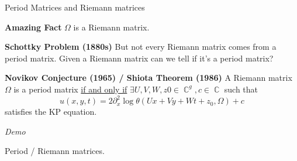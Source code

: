 \documentclass{beamer}
\DeclareMathOperator{\CC}{\mathbb{C}}
\begin{document}
\begin{frame}{Period Matrices and Riemann matrices}{}
  \begin{block}{\bf Amazing Fact}
    $\Omega$ is a Riemann matrix.
  \end{block}

  \vspace{16pt}

     {
      \begin{block}{\bf Schottky Problem (1880s)}
        But not every Riemann matrix comes from a period matrix. Given a
        Riemann matrix can we tell if it's a period matrix?
      \end{block}
    }

     {
      \begin{block}{\bf Novikov Conjecture (1965) / Shiota Theorem (1986)}
        A Riemann matrix $\Omega$ is a period matrix \underline{if and
          only if} $\exists U,V,W,z0 \in \CC^g, c \in \CC$ such that
        \[
            u(x,y,t) = 2 \partial_x^2 \log
            \theta(Ux + Vy + Wt + z_0, \Omega) + c
        \]
        satisfies the KP equation.
      \end{block}
    }


\end{frame}



\begin{frame}{\phantom{Demo}}{}
  \begin{center}
    {\huge \it Demo}

    \vspace{1cm}

    Period / Riemann matrices.
  \end{center}
\end{frame}
\end{document}
